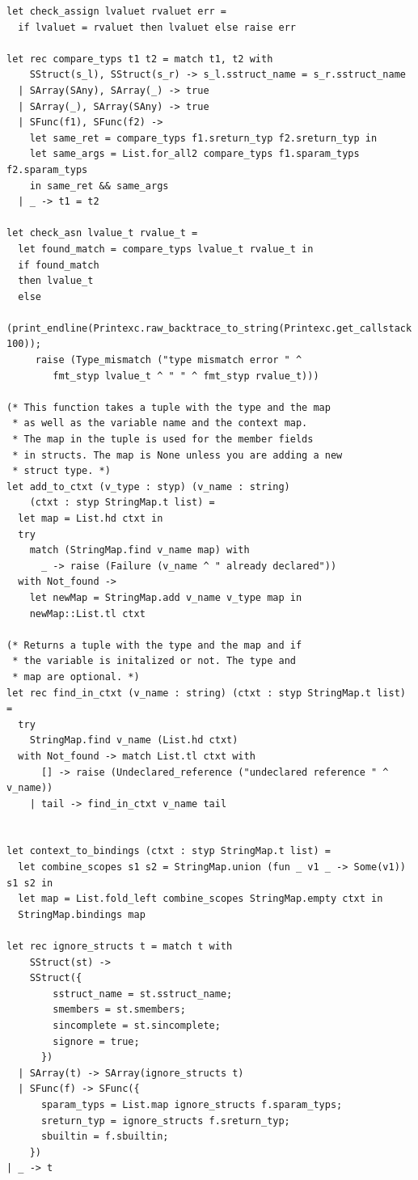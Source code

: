 \documentclass[12pt]{article}
\begin{document}
\begin{mdframed}[hidealllines=true,backgroundcolor=blue!20]
\begin{lstlisting}
let check_assign lvaluet rvaluet err =
  if lvaluet = rvaluet then lvaluet else raise err

let rec compare_typs t1 t2 = match t1, t2 with
    SStruct(s_l), SStruct(s_r) -> s_l.sstruct_name = s_r.sstruct_name
  | SArray(SAny), SArray(_) -> true
  | SArray(_), SArray(SAny) -> true
  | SFunc(f1), SFunc(f2) ->
    let same_ret = compare_typs f1.sreturn_typ f2.sreturn_typ in
    let same_args = List.for_all2 compare_typs f1.sparam_typs f2.sparam_typs
    in same_ret && same_args
  | _ -> t1 = t2

let check_asn lvalue_t rvalue_t =
  let found_match = compare_typs lvalue_t rvalue_t in
  if found_match
  then lvalue_t
  else
    (print_endline(Printexc.raw_backtrace_to_string(Printexc.get_callstack 100));
     raise (Type_mismatch ("type mismatch error " ^ 
        fmt_styp lvalue_t ^ " " ^ fmt_styp rvalue_t)))

(* This function takes a tuple with the type and the map 
 * as well as the variable name and the context map.
 * The map in the tuple is used for the member fields
 * in structs. The map is None unless you are adding a new
 * struct type. *)    
let add_to_ctxt (v_type : styp) (v_name : string) 
    (ctxt : styp StringMap.t list) =
  let map = List.hd ctxt in
  try
    match (StringMap.find v_name map) with
      _ -> raise (Failure (v_name ^ " already declared"))
  with Not_found ->
    let newMap = StringMap.add v_name v_type map in
    newMap::List.tl ctxt

(* Returns a tuple with the type and the map and if
 * the variable is initalized or not. The type and
 * map are optional. *)
let rec find_in_ctxt (v_name : string) (ctxt : styp StringMap.t list) =
  try
    StringMap.find v_name (List.hd ctxt)
  with Not_found -> match List.tl ctxt with
      [] -> raise (Undeclared_reference ("undeclared reference " ^ v_name))
    | tail -> find_in_ctxt v_name tail


let context_to_bindings (ctxt : styp StringMap.t list) =
  let combine_scopes s1 s2 = StringMap.union (fun _ v1 _ -> Some(v1)) s1 s2 in
  let map = List.fold_left combine_scopes StringMap.empty ctxt in
  StringMap.bindings map

let rec ignore_structs t = match t with
    SStruct(st) ->
    SStruct({
        sstruct_name = st.sstruct_name;
        smembers = st.smembers;
        sincomplete = st.sincomplete;
        signore = true;
      })
  | SArray(t) -> SArray(ignore_structs t)
  | SFunc(f) -> SFunc({
      sparam_typs = List.map ignore_structs f.sparam_typs;
      sreturn_typ = ignore_structs f.sreturn_typ;
      sbuiltin = f.sbuiltin;
    })
| _ -> t


\end{lstlisting}
\end{mdframed}
\end{document}
